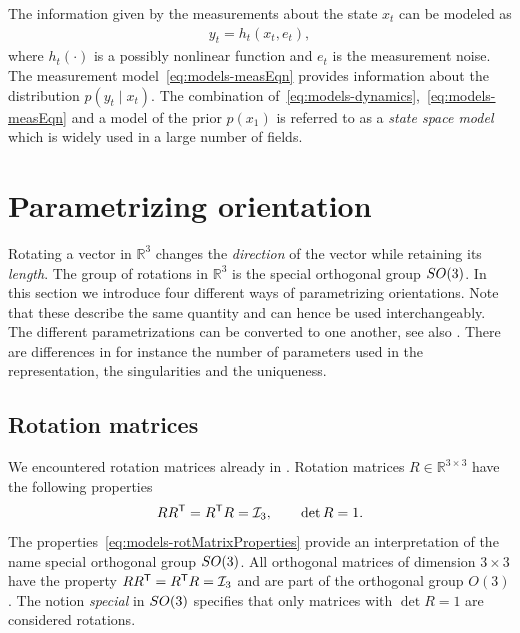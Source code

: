 The information given by the measurements about the state $x_t$ can be modeled as
\begin{align}
\label{eq:models-measEqn}
y_{t} = h_t (x_t, e_t),
\end{align}
where $h_t(\cdot)$ is a possibly nonlinear function and $e_t$ is the measurement noise. The measurement model~\eqref{eq:models-measEqn} provides information about the distribution $p(y_t \mid x_t)$. The combination of~\eqref{eq:models-dynamics},~\eqref{eq:models-measEqn} and a model of the prior $p(x_1)$ is referred to as a \emph{state space model} \citep{kailath:1980} which is widely used in a large number of fields.

\section{Parametrizing orientation}
\label{sec:models-paramOri}
Rotating a vector in $\mathbb{R}^3$ changes the \emph{direction} of the vector while retaining its \emph{length}. The group of rotations in $\mathbb{R}^3$ is the special orthogonal group $SO(3)$. In this section we introduce four different ways of parametrizing orientations. Note that these describe the same quantity and can hence be used interchangeably. The different parametrizations can be converted to one another, see also . There are differences in for instance the number of parameters used in the representation, the singularities and the uniqueness. 

\subsection{Rotation matrices}
We encountered rotation matrices already in . Rotation matrices $R \in \mathbb{R}^{3\times3}$ have the following properties
\begin{align}
  \label{eq:models-rotMatrixProperties}
  R R^{\mathsf{T}} = R^{\mathsf{T}} R = \mathcal{I}_3, \qquad \det R = 1.
\end{align}
The properties~\eqref{eq:models-rotMatrixProperties} provide an interpretation of the name special orthogonal group $SO(3)$. All orthogonal matrices of dimension $3 \times 3$ have the property $R R^{\mathsf{T}} = R^{\mathsf{T}} R = \mathcal{I}_3$ and are part of the orthogonal group $O(3)$. The notion \emph{special} in $SO(3)$ specifies that only matrices with $\det R = 1$ are considered rotations.

